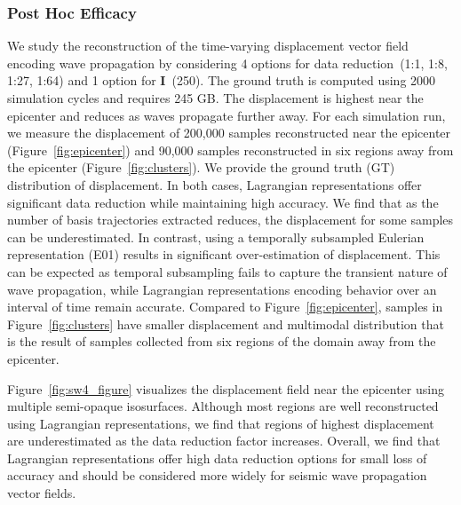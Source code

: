 \subsubsection{Post Hoc Efficacy}
We study the reconstruction of the time-varying displacement vector field encoding wave propagation by considering 4 options for data reduction~(1:1, 1:8, 1:27, 1:64) and 1 option for \textbf{I}~(250).
%
The ground truth is computed using 2000 simulation cycles and requires 245 GB.
%
The displacement is highest near the epicenter and reduces as waves propagate further away.
%
For each simulation run, we measure the displacement of 200,000 samples reconstructed near the epicenter (Figure~\ref{fig:epicenter}) and 90,000 samples reconstructed in six regions away from the epicenter (Figure~\ref{fig:clusters}).
%
We provide the ground truth (GT) distribution of displacement.
%
In both cases, Lagrangian representations offer significant data reduction while maintaining high accuracy.
%
We find that as the number of basis trajectories extracted reduces, the displacement for some samples can be underestimated. 
%
In contrast, using a temporally subsampled Eulerian representation (E01) results in significant over-estimation of displacement.
%
This can be expected as temporal subsampling fails to capture the transient nature of wave propagation, while Lagrangian representations encoding behavior over an interval of time remain accurate.
%
Compared to Figure~\ref{fig:epicenter}, samples in Figure~\ref{fig:clusters} have smaller displacement and multimodal distribution that is the result of samples collected from six regions of the domain away from the epicenter. 
%

Figure~\ref{fig:sw4_figure} visualizes the displacement field near the epicenter using multiple semi-opaque isosurfaces.
%
Although most regions are well reconstructed using Lagrangian representations, we find that regions of highest displacement are underestimated as the data reduction factor increases.
%
Overall, we find that Lagrangian representations offer high data reduction options for small loss of accuracy and should be considered more widely for seismic wave propagation vector fields.


